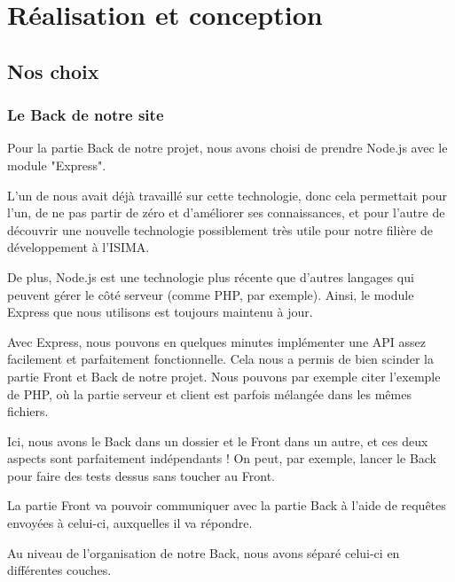 \documentclass[12pt,french]{article}
\begin{document}
\section{Réalisation et conception}

\subsection{Nos choix}

\subsubsection{Le Back de notre site}

Pour la partie \gls{Back} de notre projet, nous avons choisi de prendre Node.js avec le module "Express".

\medskip

L'un de nous avait déjà travaillé sur cette technologie, donc cela permettait pour l'un, de ne pas partir de zéro et d'améliorer ses connaissances, et pour l'autre de découvrir une nouvelle technologie possiblement très utile pour notre filière de développement à l'ISIMA.

\medskip

De plus, Node.js est une technologie plus récente que d'autres langages qui peuvent gérer le côté serveur (comme PHP, par exemple). Ainsi, le module Express que nous utilisons est toujours maintenu à jour.

\medskip

Avec Express, nous pouvons en quelques minutes implémenter une \gls{API} assez facilement et parfaitement fonctionnelle. Cela nous a permis de bien scinder la partie \gls{Front} et \gls{Back} de notre projet.
Nous pouvons par exemple citer l'exemple de PHP, où la partie serveur et client est parfois mélangée dans les mêmes fichiers.

Ici, nous avons le \gls{Back} dans un dossier et le \gls{Front} dans un autre, et ces deux aspects sont parfaitement indépendants ! On peut, par exemple, lancer le \gls{Back} pour faire des tests dessus sans toucher au \gls{Front}.

La partie \gls{Front} va pouvoir communiquer avec la partie \gls{Back} à l'aide de requêtes envoyées à celui-ci, auxquelles il va répondre.

\bigskip

Au niveau de l'organisation de notre \gls{Back}, nous avons séparé celui-ci en différentes couches.

\medskip
\end{document}
